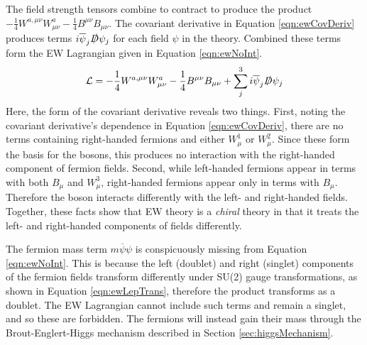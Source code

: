 The field strength tensors combine to contract to produce the product $-\frac{1}{4}W^{a,\mu\nu}W^{a}_{\mu\nu}-\frac{1}{4}B^{\mu\nu}B_{\mu\nu}$.
The covariant derivative in Equation \ref{eqn:ewCovDeriv} produces terms $i\overline{\psi}_j\slashed{D}\psi_j$ for each field $\psi$ in the theory.
Combined these terms form the EW Lagrangian given in Equation \ref{eqn:ewNoInt}.
\begin{equation}\begin{split}\label{eqn:ewNoInt}
\mathcal{L} = -\frac{1}{4}W^{a,\mu\nu}W^{a}_{\mu\nu}- \frac{1}{4}B^{\mu\nu}B_{\mu\nu}+ \sum_j^3 i\overline{\psi}_j\slashed{D}\psi_j
\end{split}\end{equation}
Here, the form of the covariant derivative reveals two things.
First, noting the covariant derivative's dependence in Equation \ref{eqn:ewCovDeriv}, there are no terms containing right-handed fermions and either $W^1_\mu$ or $W^2_\mu$. Since these form the basis for the \W bosons, this produces no interaction with the right-handed component of fermion fields.
Second, while left-handed fermions appear in terms with both $B_\mu$ and $W^3_\mu$, right-handed fermions appear only in terms with $B_\mu$. Therefore the \Z boson interacts differently with the left- and right-handed fields.
Together, these facts show that EW theory is a \emph{chiral} theory in that it treats the left- and right-handed components of fields differently.

The fermion mass term $m\overline{\psi}\psi$ is conspicuously missing from Equation \ref{eqn:ewNoInt}.
This is because the left (doublet) and right (singlet) components of the fermion fields transform differently under SU(2) gauge transformations, as shown in Equation \ref{eqn:ewLepTrans}, therefore the product transforms as a doublet.
The EW Lagrangian cannot include such terms and remain a singlet, and so these are forbidden.
The fermions will instead gain their mass through the Brout-Englert-Higgs mechanism described in Section \ref{sec:higgsMechanism}.

